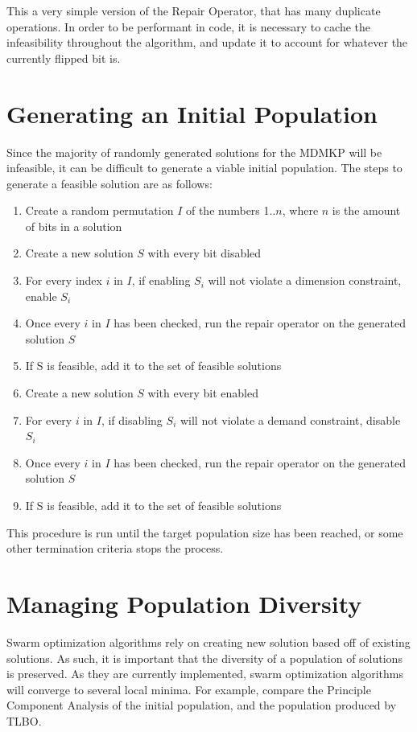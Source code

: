 \documentclass[11pt, letterpaper, onecolumn]{article}
\begin{document}
This a very simple version of the Repair Operator, that has many duplicate operations. In order to be performant in code, it is necessary to cache the infeasibility throughout the algorithm, and update it to account for whatever the currently flipped bit is. 

\section{Generating an Initial Population}

Since the majority of randomly generated solutions for the MDMKP will be infeasible, it can be difficult to generate a viable initial population. The steps to generate a feasible solution are as follows:

\begin{enumerate}
\item Create a random permutation $I$ of the numbers 1..$n$, where $n$ is the amount of bits in a solution
\item Create a new solution $S$ with every bit disabled
\item For every index $i$ in $I$, if enabling $S_i$ will not violate a dimension constraint, enable $S_i$
\item Once every $i$ in $I$ has been checked, run the repair operator on the generated solution $S$
\item If S is feasible, add it to the set of feasible solutions
\item Create a new solution $S$ with every bit enabled
\item For every $i$ in $I$, if disabling $S_i$ will not violate a demand constraint, disable $S_i$
\item Once every $i$ in $I$ has been checked, run the repair operator on the generated solution $S$
\item If S is feasible, add it to the set of feasible solutions
\end{enumerate}

This procedure is run until the target population size has been reached, or some other termination criteria stops the process. 

\section{Managing Population Diversity}

Swarm optimization algorithms rely on creating new solution based off of existing solutions. As such, it is important that the diversity of a population of solutions is preserved. As they are currently implemented, swarm optimization algorithms will converge to several local minima. For example, compare the Principle Component Analysis of the initial population, and the population produced by TLBO. 
\end{document}
